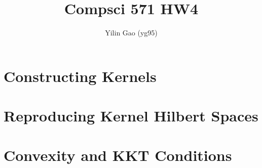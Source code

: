 \documentclass[paper=letter, fontsize=12pt]{article}
\title{Compsci 571 HW4}
\author{Yilin Gao (yg95)}
\begin{document}
\maketitle
\section{Constructing Kernels}

\section{Reproducing Kernel Hilbert Spaces}

\section{Convexity and KKT Conditions}
\end{document}
